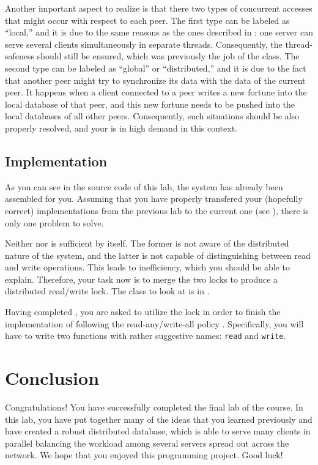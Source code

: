 \documentclass[a4paper]{article}
\begin{document}
Another important aspect to realize is that there two types of concurrent
accesses that might occur with respect to each peer. The first type can be
labeled as ``local,'' and it is due to the same reasons as the ones described in
: one server can serve several clients simultaneously in separate
threads. Consequently, the thread-safeness should still be ensured, which was
previously the job of the  class. The second type can
be labeled as ``global'' or ``distributed,'' and it is due to the fact that
another peer might try to synchronize its data with the data of the current
peer. It happens when a client connected to a peer writes a new fortune into the
local database of that peer, and this new fortune needs to be pushed into the
local databases of all other peers. Consequently, such situations should be also
properly resolved, and your  is in high demand in
this context.

\subsection{Implementation} 
As you can see in the source code of this lab, the system has already been
assembled for you. Assuming that you have properly transfered your (hopefully
correct) implementations from the previous lab to the current one (see
), there is only one problem to solve.

Neither  nor  is sufficient
by itself. The former is not aware of the distributed nature of the system, and
the latter is not capable of distinguishing between read and write operations.
This leads to inefficiency, which you should be able to explain. Therefore, your
task now is to merge the two locks to produce a distributed read/write lock. The
class to look at is  in
.

Having completed , you are asked to utilize
the lock in order to finish the implementation of 
following the read-any/write-all policy \cite{lecture8}. Specifically, you will
have to write two functions with rather suggestive names: \texttt{read} and
\texttt{write}.

\section{Conclusion}
Congratulations! You have successfully completed the final lab of the course. In
this lab, you have put together many of the ideas that you learned previously
and have created a robust distributed database, which is able to serve many
clients in parallel balancing the workload among several servers spread out
across the network. We hope that you enjoyed this programming project. Good
luck!

\printbibliography
\end{document}
